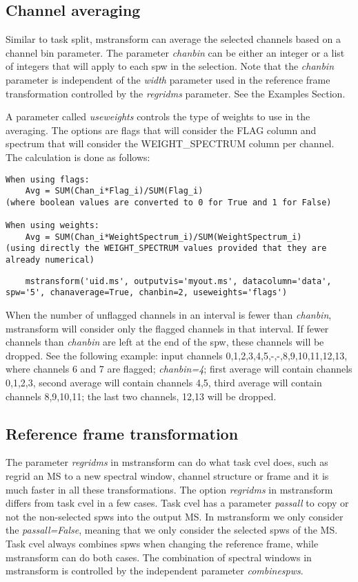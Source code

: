 \subsection{Channel averaging}
Similar to task split, mstransform can average the selected channels based on a
channel bin parameter. The parameter {\it chanbin} can be either an integer or a list of
integers that will apply to each spw in the selection. Note that the {\it chanbin}
parameter is independent of the {\it width} parameter used in the reference frame
transformation controlled by the {\it regridms} parameter. See the Examples Section.

A parameter called {\it useweights} controls the type of weights to use in the
averaging. The options are flags that will consider the FLAG column and spectrum
that will consider the WEIGHT_SPECTRUM column per channel. The calculation is
done as follows:

\begin{verbatim}
When using flags:
    Avg = SUM(Chan_i*Flag_i)/SUM(Flag_i)     
(where boolean values are converted to 0 for True and 1 for False)

When using weights:
    Avg = SUM(Chan_i*WeightSpectrum_i)/SUM(WeightSpectrum_i)     
(using directly the WEIGHT_SPECTRUM values provided that they are already numerical)

\end{verbatim}

\begin{verbatim}
    mstransform('uid.ms', outputvis='myout.ms', datacolumn='data', spw='5', chanaverage=True, chanbin=2, useweights='flags')
\end{verbatim}

When the number of unflagged channels in an interval is fewer than {\it chanbin}, mstransform will consider only the flagged channels
in that interval. If fewer  channels than {\it chanbin} are left at the end of the spw, these channels will be dropped.
See the following example: input channels 0,1,2,3,4,5,-,-,8,9,10,11,12,13, where channels 6 and 7 are flagged;
{\it chanbin=4}; first average will contain channels 0,1,2,3, second average will contain channels 4,5, third average will
contain channels 8,9,10,11; the last two channels, 12,13 will be dropped.


\subsection{Reference frame transformation}
The parameter {\it regridms} in mstransform can do what task cvel does, such as
regrid an MS to a new spectral window, channel structure or frame and it is
much faster in all these transformations. The option {\it regridms} in
mstransform differs from task cvel in a few cases. Task cvel has a parameter {\it passall} 
to copy or not the non-selected spws into the output MS. In mstransform we only consider 
the {\it passall=False}, meaning that we only consider the
selected spws of the MS. Task cvel always combines spws when changing the reference
frame, while mstransform can do both cases. The combination of spectral windows in mstransform
is controlled by the independent parameter {\it combinespws}.

